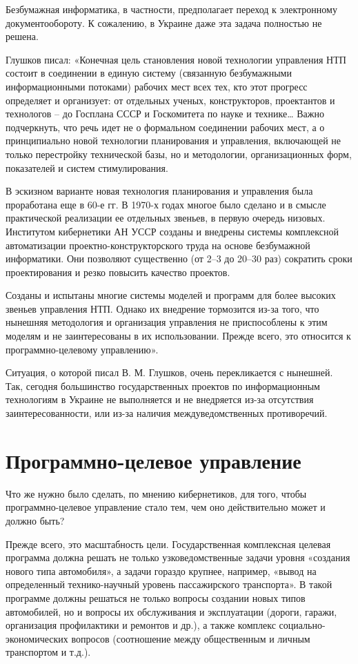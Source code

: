 Безбумажная информатика, в частности, предполагает переход к электронному
документообороту. К сожалению, в Украине даже эта задача полностью не решена.
 
Глушков писал: «Конечная цель становления новой технологии управления НТП
состоит в соединении в единую систему (связанную безбумажными информационными
потоками) рабочих мест всех тех, кто этот прогресс определяет и организует: от
отдельных ученых, конструкторов, проектантов и технологов – до Госплана СССР и
Госкомитета по науке и технике… Важно подчеркнуть, что речь идет не о формальном
соединении рабочих мест, а о принципиально новой технологии планирования и
управления, включающей не только перестройку технической базы, но и методологии,
организационных форм, показателей и систем стимулирования.
 
В эскизном варианте новая технология планирования и управления была проработана
еще в 60-е гг. В 1970-х годах многое было сделано и в смысле практической
реализации ее отдельных звеньев, в первую очередь низовых. Институтом
кибернетики АН УССР созданы и внедрены системы комплексной автоматизации
проектно-конструкторского труда на основе безбумажной информатики. Они позволяют
существенно (от 2--3 до 20--30 раз) сократить сроки проектирования и резко
повысить качество проектов.
 
Созданы и испытаны многие системы моделей и программ для более высоких звеньев
управления НТП. Однако их внедрение тормозится из-за того, что нынешняя
методология и организация управления не приспособлены к этим моделям и не
заинтересованы в их использовании. Прежде всего, это относится к
программно-целевому управлению».\cite{b1}
 
Ситуация, о которой писал В. М. Глушков, очень перекликается с нынешней. Так,
сегодня большинство государственных проектов по информационным технологиям в
Украине не выполняется и не внедряется из-за отсутствия заинтересованности, или
из-за наличия междуведомственных противоречий.
 
\section{Программно-целевое управление}
 
Что же нужно было сделать, по мнению кибернетиков, для того, чтобы
программно-целевое управление стало тем, чем оно действительно может и должно
быть?
 
Прежде всего, это масштабность цели. Государственная комплексная целевая
программа должна решать не только узковедомственные задачи уровня «создания
нового типа автомобиля», а задачи гораздо крупнее, например, «вывод на
определенный технико-научный уровень пассажирского транспорта». В такой
программе должны решаться не только вопросы создании новых типов автомобилей, но
и вопросы их обслуживания и эксплуатации (дороги, гаражи, организация
профилактики и ремонтов и др.), а также комплекс социально-экономических
вопросов (соотношение между общественным и личным транспортом и т.д.).

